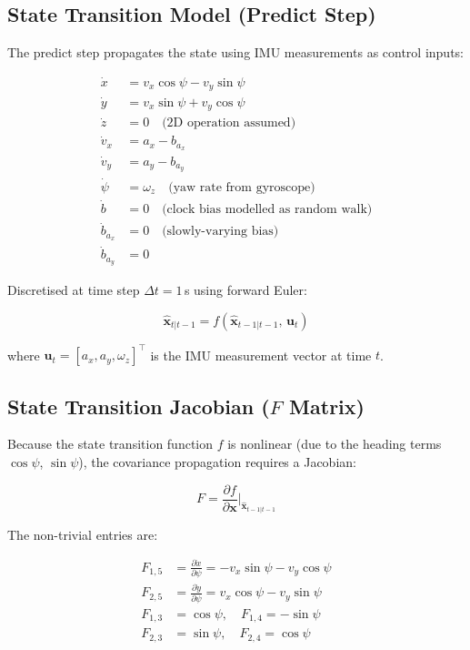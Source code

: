 \documentclass[12pt,a4paper]{article}
\begin{document}
\subsection{State Transition Model (Predict Step)}

The predict step propagates the state using IMU measurements as control inputs:

\begin{align}
  \dot{x}     &= v_x \cos\psi - v_y \sin\psi \\
  \dot{y}     &= v_x \sin\psi + v_y \cos\psi \\
  \dot{z}     &= 0 \quad\text{(2D operation assumed)} \\
  \dot{v}_x   &= a_x - b_{a_x} \\
  \dot{v}_y   &= a_y - b_{a_y} \\
  \dot{\psi}  &= \omega_z \quad\text{(yaw rate from gyroscope)} \\
  \dot{b}     &= 0 \quad\text{(clock bias modelled as random walk)} \\
  \dot{b}_{a_x} &= 0 \quad\text{(slowly-varying bias)} \\
  \dot{b}_{a_y} &= 0
\end{align}

Discretised at time step $\Delta t = 1$\,s using forward Euler:

\begin{equation}
  \hat{\mathbf{x}}_{t|t-1} = f(\hat{\mathbf{x}}_{t-1|t-1},\, \mathbf{u}_t)
\end{equation}

where $\mathbf{u}_t = [a_x, a_y, \omega_z]^\top$ is the IMU measurement vector
at time $t$.

\subsection{State Transition Jacobian ($F$ Matrix)}

Because the state transition function $f$ is nonlinear (due to the heading terms
$\cos\psi$, $\sin\psi$), the covariance propagation requires a Jacobian:

\begin{equation}
  F = \frac{\partial f}{\partial \mathbf{x}}\bigg|_{\hat{\mathbf{x}}_{t-1|t-1}}
\end{equation}

The non-trivial entries are:

\begin{align}
  F_{1,5} &= \frac{\partial \dot{x}}{\partial \psi} = -v_x\sin\psi - v_y\cos\psi \\
  F_{2,5} &= \frac{\partial \dot{y}}{\partial \psi} = v_x\cos\psi - v_y\sin\psi \\
  F_{1,3} &= \cos\psi,\quad F_{1,4} = -\sin\psi \\
  F_{2,3} &= \sin\psi,\quad F_{2,4} = \cos\psi
\end{align}
\end{document}
